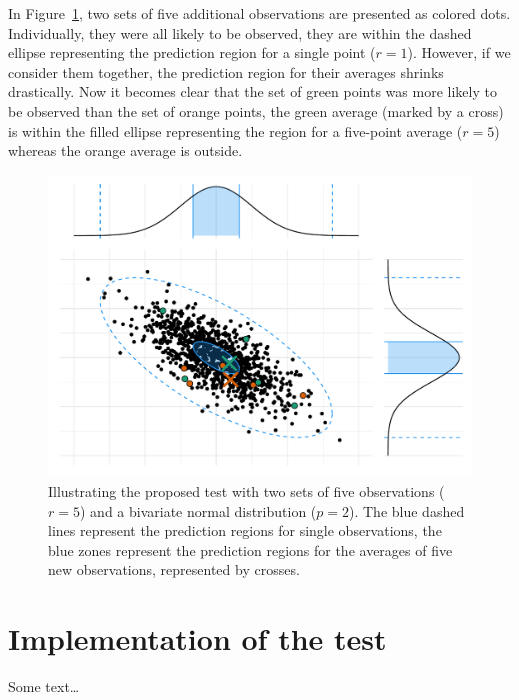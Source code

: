             In Figure~\ref{fig:non_regression:stat:several_points}, two sets of five additional observations are presented
            as colored dots. Individually, they were all likely to be observed, they are within the dashed ellipse
            representing the  prediction region for a single point (\ie \(r=1\)). However, if we
            consider them together, the prediction region for their averages shrinks drastically. Now it becomes clear that
            the set of green points was more likely to be observed than the set of orange points, the green average (marked
            by a cross) is within the filled ellipse representing the  region for a five-point average
            (\ie \(r=5\)) whereas the orange average is outside.

            \begin{figure}[htpb]
                \centering
                \includegraphics[width=1\linewidth]{img/experiment/non_regression/statistics/several_points.pdf}
                \caption{Illustrating the proposed test with two sets of five observations (\(r=5\)) and a bivariate normal
                distribution (\(p=2\)). The blue dashed lines represent the  prediction regions for
                single observations, the blue zones represent the  prediction regions for the averages of
                five new observations, represented by crosses.}%
                \label{fig:non_regression:stat:several_points}
            \end{figure}

    \section{Implementation of the test}%
    \label{sec:test_implementation}
        Some text\dots

